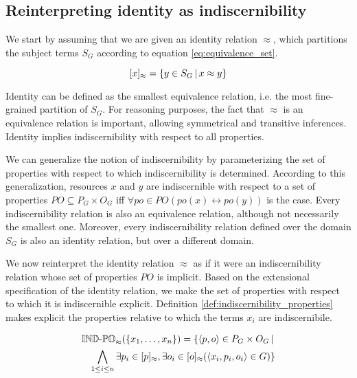 \subsection{Reinterpreting identity as indiscernibility}

We start by assuming that we are given an identity relation $\approx$,
  which partitions the subject terms $S_G$ according to
  \mbox{equation} \ref{eq:equivalence_set}.

\begin{equation}
\label{eq:equivalence_set}
  [x]_{\approx}
=
  \{
    y \in S_G
  \,\vert\,
    x \approx y
  \}
\end{equation}

\noindent Identity can be defined as the smallest equivalence relation,
  i.e. the most fine-grained partition of $S_G$.
For reasoning purposes, the fact that $\approx$ is an equivalence relation
  is important, allowing symmetrical and transitive inferences.
Identity implies indiscernibility with respect to all properties.

We can generalize the notion of indiscernibility
  by parameterizing the set of properties with respect to which
  indiscernibility is determined.
According to this generalization,
  resources $x$ and $y$ are indiscernible with respect to
  a set of properties $PO \subseteq P_G \times O_G$
  iff $\forall po \in PO (po(x) \leftrightarrow po(y))$ is the case.
Every indiscernibility relation is also an equivalence relation,
  although not necessarily the smallest one.
Moreover, every indiscernibility relation defined over the domain $S_G$
  is also an identity relation, but over a different domain.

We now reinterpret the identity relation $\approx$
  as if it were an indiscernibility relation
  whose set of properties $PO$ is implicit.
Based on the extensional specification of the identity relation,
  we make the set of properties with respect to which it is indiscernible
  explicit.
Definition \ref{def:indiscernibility_properties} makes explicit
  the properties relative to which the terms $x_i$ are indiscernibile.

\begin{definition}
\label{def:indiscernibility_properties}
\begin{align}
  \operatorname{{\mathbb{IND}-\mathbb{PO}}}_{\approx}(\{x_1,\ldots,x_n\})
=
  \{
    \langle p,o\rangle \in P_G \times O_G
  \,\vert\,\nonumber\\
    \bigwedge_{1 \leq i \leq n}
      \exists p_i \in [p]_{\approx},
        \exists o_i \in [o]_{\approx}(
          \langle x_i,p_i,o_i\rangle \in G
        )
  \}\nonumber
\end{align}
\end{definition}

